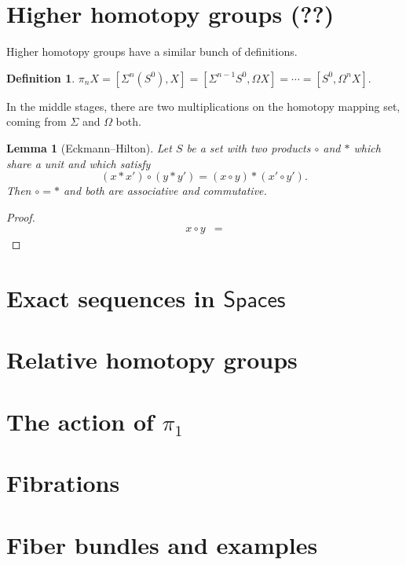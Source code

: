 \documentclass{amsart}
\newcommand{\CatOf}[1]{\mathsf{#1}}
\newcommand{\Loops}{\Omega}
\newcommand{\Susp}{\Sigma}
\theoremstyle{plain}
\newtheorem{lemma}[dummy]{Lemma}
\theoremstyle{definition}
\newtheorem{definition}[dummy]{Definition}
\theoremstyle{remark}
\begin{document}
\section{Higher homotopy groups (??)}

Higher homotopy groups have a similar bunch of definitions.

\begin{definition}
$\pi_n X = [\Susp^n(S^0), X] = [\Susp^{n-1} S^0, \Loops X] = \cdots = [S^0, \Loops^n X]$.
\end{definition}

In the middle stages, there are two multiplications on the homotopy mapping set, coming from $\Susp$ and $\Loops$ both.

\begin{lemma}[Eckmann--Hilton]
Let $S$ be a set with two products $\circ$ and $*$ which share a unit and which satisfy \[(x * x') \circ (y * y') = (x \circ y) * (x' \circ y').\]  Then $\circ = *$ and both are associative and commutative.
\end{lemma}
\begin{proof}
\begin{align*}
x \circ y & = 
\end{align*}
\end{proof}




\section{Exact sequences in $\CatOf{Spaces}$}




\section{Relative homotopy groups}




\section{The action of $\pi_1$}




\section{Fibrations}




\section{Fiber bundles and examples}
\end{document}
